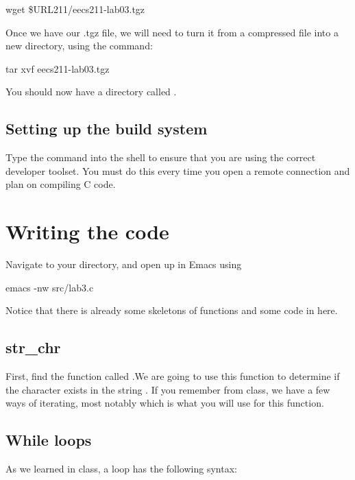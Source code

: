 \documentclass{tufte-handout}
\def\ThisLabBase{eecs211-lab03}
\begin{document}
\begin{CmdLine}
  \prompt wget \$URL211/\ThisLabBase.tgz
\end{CmdLine}

Once we have our .tgz file, we will need to turn it from a compressed
file into a new directory, using the  command:

\begin{CmdLine}
  \prompt tar xvf \ThisLabBase.tgz
\end{CmdLine}

You should now have a directory called \filename{\ThisLabBase}.

\subsection{Setting up the build system}
Type the  command into the shell to ensure that you are
using the correct developer toolset. You must do this every time you
open a remote connection and plan on compiling C code.

\section{Writing the code}
Navigate to your \filename{\LabBaseUrl} directory, and open up
 in Emacs using
\begin{CmdLine}
  \prompt emacs -nw src/lab3.c
\end{CmdLine}
Notice that there is already some skeletons of functions and some code in  here.

\subsection{str_chr}
First, find the function called .We are going to use this function to determine if the character  exists in the string . If you remember from class, we have a few ways of iterating, most notably  which is what you will use for this function.

\subsection{While loops}
As we learned in class, a  loop has the following
syntax:
\end{document}

